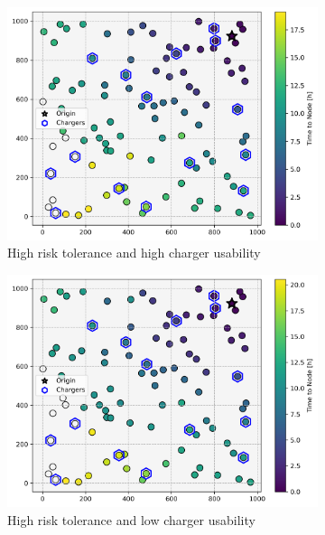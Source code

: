 \documentclass[12pt]{article}
\begin{document}
\begin{figure}[H]
	\centering
	\begin{subfigure}{.5\linewidth}
		\centering\includegraphics[width = \linewidth]{figs/parameter_factorial_00.png}
		\captionsetup{width=.8\linewidth}
		\caption{High risk tolerance and high charger usability}
	\end{subfigure}%
	\begin{subfigure}{.5\linewidth}
		\centering\includegraphics[width = \linewidth]{figs/parameter_factorial_01.png}
		\captionsetup{width=.8\linewidth}
		\caption{High risk tolerance and low charger usability}
	\end{subfigure}
	\begin{subfigure}{.5\linewidth}

\end{subfigure}
\end{figure}
\end{document}
